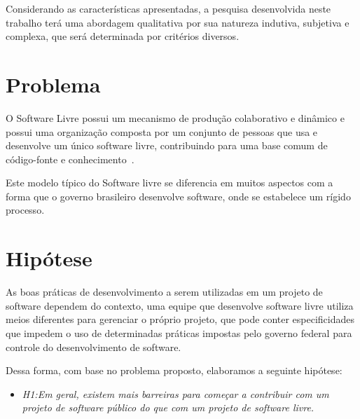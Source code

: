 Considerando as características apresentadas, a pesquisa desenvolvida neste trabalho
terá uma abordagem qualitativa por sua natureza indutiva, subjetiva e complexa, que será 
determinada por critérios diversos.

\section{Problema}

O Software Livre possui um mecanismo de produção colaborativo e dinâmico 
e possui uma organização composta por um conjunto de pessoas que usa e desenvolve 
um único software livre, contribuindo para uma base comum de código-fonte e 
conhecimento~\cite{reis2003caracterizacc}.

Este modelo típico do Software livre se diferencia em muitos aspectos com a forma
que o governo brasileiro desenvolve software, onde se estabelece um rígido processo.


\section{Hipótese}

As boas práticas de desenvolvimento a serem utilizadas em um projeto de software 
dependem do contexto, uma equipe que desenvolve software livre utiliza
meios diferentes para gerenciar o próprio projeto, que pode conter especificidades 
que impedem o uso de determinadas práticas impostas pelo governo federal para controle
do desenvolvimento de software. 

Dessa forma, com base no problema proposto, elaboramos a seguinte hipótese:

\begin{itemize}
\item \emph{H1:Em geral, existem mais barreiras para começar a contribuir 
com um projeto de software público do que com um projeto de software livre.}

\end{itemize}


